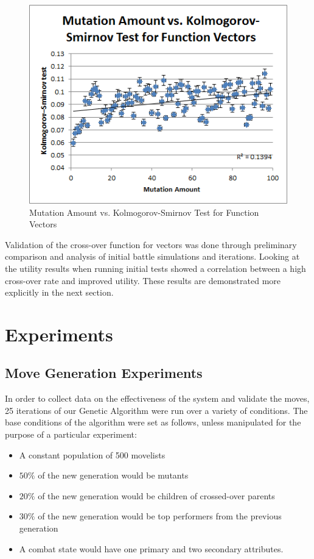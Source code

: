 \documentclass{acm_proc_article-sp}
\begin{document}
    \begin{figure}[h]
        \centering
        \includegraphics[width=\columnwidth]{./images/fv-mut-vs-ks-test.png}
        \caption{Mutation Amount vs. Kolmogorov-Smirnov Test for Function Vectors}
        \label{fv-mut-vs-ks-test}
    \end{figure}
    
    Validation of the cross-over function for vectors was done through preliminary comparison and analysis of initial battle simulations and iterations. Looking at the utility results when running initial tests showed a correlation between a high cross-over rate and improved utility. These results are demonstrated more explicitly in the next section.
    
    \section{Experiments}
    
    \subsection{Move Generation Experiments}

In order to collect data on the effectiveness of the system and validate the moves, 25 iterations of our Genetic Algorithm were run over a variety of conditions. The base conditions of the algorithm were set as follows, unless manipulated for the purpose of a particular experiment: 
\begin{itemize}
    \item A constant population of 500 movelists
    \item $50\%$ of the new generation would be mutants
    \item $20\%$ of the new generation would be children of crossed-over parents
    \item $30\%$ of the new generation would be top performers from the previous generation
    \item A combat state would have one primary and two secondary attributes.
\end{itemize}
\end{document}
